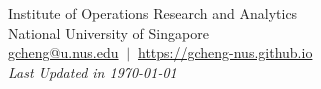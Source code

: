 \documentclass[12pt, a4paper]{article}
\begin{document}




{\par {} \par}
\centering
\footnotesize{Institute of Operations Research and Analytics} \\
\footnotesize{National University of Singapore} \\
\footnotesize{\href{mailto:gcheng@u.nus.edu}{gcheng@u.nus.edu}} $\ \vert \ $ \footnotesize{\href{https://gcheng-nus.github.io}{https://gcheng-nus.github.io}} \\
\vspace*{0.5em}
\footnotesize{\textit{Last Updated in \monthyeardate\today}}

\vspace*{1em}
\end{document}
